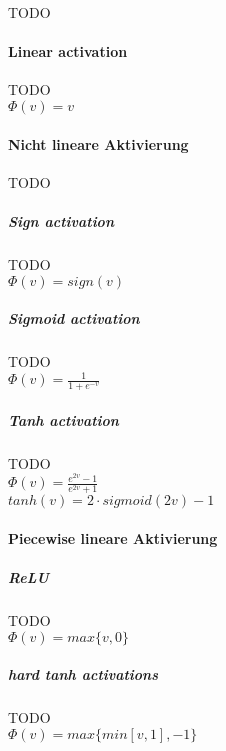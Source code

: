 TODO
\paragraph{Linear activation}
TODO\\
$\Phi(v) = v$
\paragraph{Nicht lineare Aktivierung}
TODO
\subparagraph{Sign activation}
TODO\\
$\Phi(v) = sign(v)$
\subparagraph{Sigmoid activation}
TODO\\
$\Phi(v) = \frac{1}{1 + e^{-v}}$
\subparagraph{Tanh activation}
TODO\\
$\Phi(v) = \frac{e^{2v} - 1}{e^{2v} + 1}$\\
$tanh(v) = 2 \cdot sigmoid(2v) - 1$
\paragraph{Piecewise lineare Aktivierung}
\subparagraph{ReLU}
TODO\\
$\Phi(v) = max\{v,0\}$
\subparagraph{hard tanh activations}
TODO\\
$\Phi(v) = max\{min[v,1],-1\}$